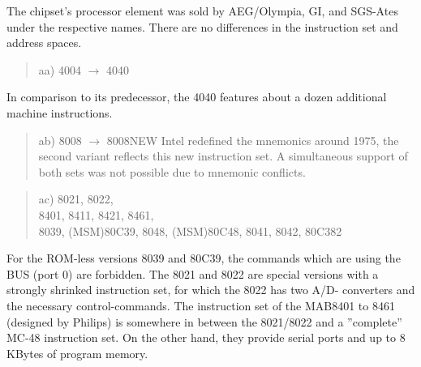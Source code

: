 \documentclass[12pt,twoside]{report}
\begin{document}
The chipset's processor element was sold by AEG/Olympia, GI,
and SGS-Ates under the respective names.  There are no differences
in the instruction set and address spaces.
\begin{quote}
aa) 4004 $\rightarrow$ 4040
\end{quote}
In comparison to its predecessor, the 4040 features about a dozen
additional machine instructions.
\begin{quote}
ab) 8008 $\rightarrow$ 8008NEW
Intel redefined the mnemonics around 1975, the second variant reflects
this new instruction set.  A simultaneous support of both sets was not
possible due to mnemonic conflicts.
\end{quote}
\begin{quote}
ac) 8021, 8022, \\
    8401, 8411, 8421, 8461, \\
    8039, (MSM)80C39, 8048, (MSM)80C48, 8041, 8042, 80C382
\end{quote}
For the ROM-less versions 8039 and 80C39, the commands which are
using the BUS (port 0) are forbidden.  The 8021 and 8022 are special
versions with a strongly shrinked instruction set, for which the 8022
has two A/D- converters and the necessary control-commands.  The 
instruction set of the MAB8401 to 8461 (designed by Philips) is
somewhere in between the 8021/8022 and a ''complete'' MC-48 instruction
set.  On the other hand, they provide serial ports and up to 8 KBytes
of program memory.
\end{document}
